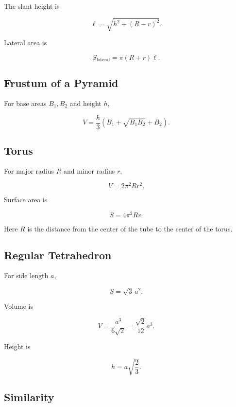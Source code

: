 The slant height is

\[
\boxed{
\ell
=
\sqrt{
h^2+(R-r)^2
}.
}
\]

Lateral area is

\[
\boxed{
S_{\mathrm{lateral}}
=
\pi(R+r)\ell.
}
\]

\subsection{Frustum of a Pyramid}
\label{subsec:pyramid-frustum-volume}

For base areas \(B_1,B_2\) and height \(h\),

\[
\boxed{
V
=
\frac{h}{3}
\left(
B_1
+
\sqrt{B_1B_2}
+
B_2
\right).
}
\]

\subsection{Torus}
\label{subsec:torus-formulas}

For major radius \(R\) and minor radius \(r\),

\[
\boxed{
V
=
2\pi^2Rr^2.
}
\]

Surface area is

\[
\boxed{
S
=
4\pi^2Rr.
}
\]

Here \(R\) is the distance from the center of the tube to the center of the
torus.

\subsection{Regular Tetrahedron}
\label{subsec:regular-tetrahedron-formulas}

For side length \(a\),

\[
\boxed{
S
=
\sqrt3\,a^2.
}
\]

Volume is

\[
\boxed{
V
=
\frac{a^3}{6\sqrt2}
=
\frac{\sqrt2}{12}a^3.
}
\]

Height is

\[
\boxed{
h
=
a\sqrt{\frac23}.
}
\]

\subsection{Similarity}
\label{subsec:similarity-scaling-reference}


